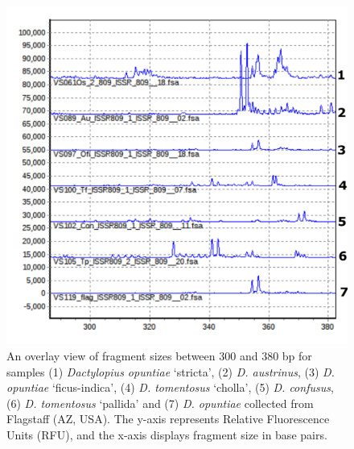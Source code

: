 \begin{figure}[H]
	\centering
	\includegraphics[scale = 1]{Images/overlay_electrophero.png}
	\caption{An overlay view of fragment sizes between 300 and 380 bp for samples (1) \textit{Dactylopius opuntiae} `stricta', (2) \textit{D. austrinus}, (3) \textit{D. opuntiae} `ficus-indica', (4) \textit{D. tomentosus} `cholla', (5) \textit{D. confusus}, (6) \textit{D. tomentosus} `pallida' and (7) \textit{D. opuntiae} collected from Flagstaff (AZ, USA). The y-axis represents Relative Fluorescence Units (RFU), and the x-axis displays fragment size in base pairs.} 
	\label{fig:overlay_electro}
\end{figure}

